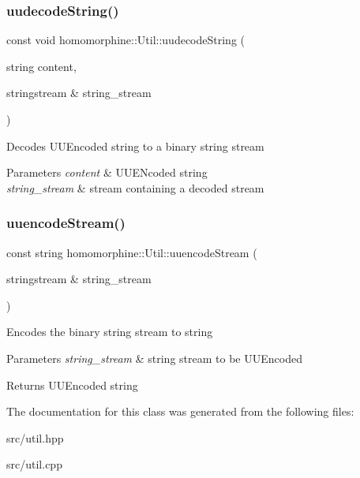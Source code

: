 \subsubsection{\texorpdfstring{uudecodeString()}{uudecodeString()}}
{\footnotesize\ttfamily const void homomorphine\+::\+Util\+::uudecode\+String (\begin{DoxyParamCaption}\item[{string}]{content,  }\item[{stringstream \&}]{string\+\_\+stream }\end{DoxyParamCaption})\hspace{0.3cm}{\ttfamily [static]}}

Decodes U\+U\+Encoded string to a binary string stream


\begin{DoxyParams}{Parameters}
{\em content} & U\+U\+E\+Ncoded string \\
\hline
{\em string\+\_\+stream} & stream containing a decoded stream \\
\hline
\end{DoxyParams}
\mbox{\label{classhomomorphine_1_1_util_a26f29995aa48f4374993ec4afeca2ac8}} 
\subsubsection{\texorpdfstring{uuencodeStream()}{uuencodeStream()}}
{\footnotesize\ttfamily const string homomorphine\+::\+Util\+::uuencode\+Stream (\begin{DoxyParamCaption}\item[{stringstream \&}]{string\+\_\+stream }\end{DoxyParamCaption})\hspace{0.3cm}{\ttfamily [static]}}

Encodes the binary string stream to string


\begin{DoxyParams}{Parameters}
{\em string\+\_\+stream} & string stream to be U\+U\+Encoded \\
\hline
\end{DoxyParams}
\begin{DoxyReturn}{Returns}
U\+U\+Encoded string 
\end{DoxyReturn}


The documentation for this class was generated from the following files\+:\begin{DoxyCompactItemize}
\item 
src/util.\+hpp\item 
src/util.\+cpp\end{DoxyCompactItemize}
